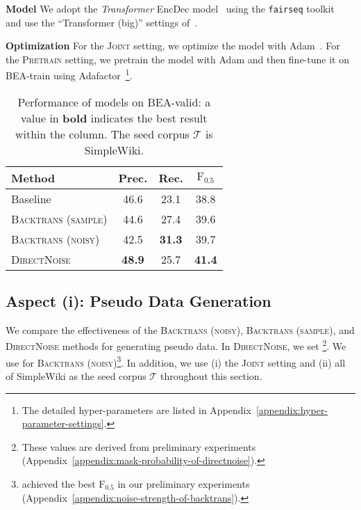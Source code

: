 \documentclass[11pt,a4paper]{article}
\newcommand{\backtrans}{\textsc{Backtrans (noisy)}}
\newcommand{\samplebacktrans}{\textsc{Backtrans (sample)}}
\newcommand{\directnoise}{\textsc{DirectNoise}}
\newcommand{\joint}{\textsc{Joint}}
\newcommand{\pretrain}{\textsc{Pretrain}}
\newcommand{\seedcorpus}{\ensuremath{\mathcal{T}}}
\newcommand{\fscore}{\ensuremath{\mathrm{F}_{0.5}}}
\begin{document}
\noindent\textbf{Model}\hspace*{3mm}
We adopt the \textit{Transformer} EncDec model~\citep{vaswani:2017:NIPS} using the \texttt{fairseq} toolkit~\citep{ott2019:arxiv:fairseq} and use the ``Transformer (big)'' settings of~\citet{vaswani:2017:NIPS}. 

\noindent\textbf{Optimization}\hspace*{3mm}
For the \joint{} setting, we optimize the model with Adam~\cite{kingma:2015:ICLR}.
For the \pretrain{} setting, we pretrain the model with Adam and then fine-tune it on BEA-train using Adafactor~\citep{shazeer:2018:adafactor}\footnote{The detailed hyper-parameters are listed in Appendix~\ref{appendix:hyper-parameter-settings}.}.



\begin{table}[t!]
\centering
\small
\begin{tabular}{lccc}
\toprule
Method  & \multicolumn{1}{c}{Prec.} & \multicolumn{1}{c}{Rec.} & \multicolumn{1}{c}{\fscore{}} \\
\midrule
Baseline                          &  46.6  &  23.1  &  38.8  \\
\midrule
\samplebacktrans{}                &  44.6  &  27.4  &  39.6 \\
\backtrans{}                      &  42.5  &  \textbf{31.3}  &  39.7 \\
\directnoise{}                    &  \textbf{48.9}  &  25.7  &  \textbf{41.4} \\
\bottomrule
\end{tabular}

\vskip -2mm
\caption{Performance of models on BEA-valid: a value in \textbf{bold} indicates the best result within the column. The seed corpus \seedcorpus{} is SimpleWiki.}
\label{table:result-pseudo-data-generation}
\end{table}

\subsection{Aspect (i): Pseudo Data Generation}
\label{subsec:pseudo-data-generation-methods}

We compare the effectiveness of the \backtrans{}, \samplebacktrans{}, and \directnoise{} methods for generating pseudo data.
In \directnoise{}, we set \footnote{These values are derived from preliminary experiments (Appendix~\ref{appendix:mask-probability-of-directnoise}).}.
We use  for \backtrans{}\footnote{ achieved the best \fscore{} in our preliminary experiments (Appendix~\ref{appendix:noise-strength-of-backtrans}).}.
In addition, we use (i) the \joint{}  setting and (ii) all of SimpleWiki as the seed corpus \seedcorpus{} throughout this section.
\end{document}
